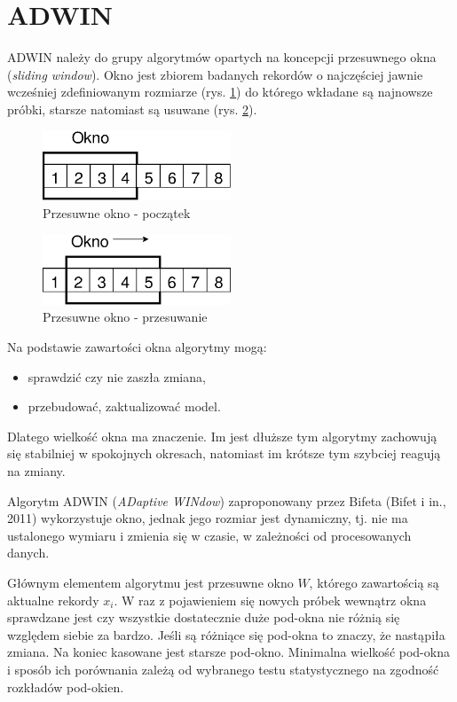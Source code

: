 \section{ADWIN}
\label{sec:ADWIN}
ADWIN należy do grupy algorytmów opartych na koncepcji przesuwnego okna (\textit{sliding window}).
Okno jest zbiorem badanych rekordów o najczęściej jawnie wcześniej zdefiniowanym rozmiarze (rys. \ref{fig:SlidingWindowInit})
do którego wkładane są najnowsze próbki, starsze natomiast są usuwane (rys. \ref{fig:SlidingWindowMove}).
\begin{figure}[htbp]
\centering
	\includegraphics[width=0.5\textwidth]{img/slidingWindowInit}
	\caption{Przesuwne okno - początek}
  \label{fig:SlidingWindowInit}
\end{figure}
\begin{figure}[htbp]
\centering
	\includegraphics[width=0.5\textwidth]{img/slidingWindowMove}
	\caption{Przesuwne okno - przesuwanie}
  \label{fig:SlidingWindowMove}
\end{figure}
Na podstawie zawartości okna algorytmy mogą:
\begin{itemize}
  \item sprawdzić czy nie zaszła zmiana,
  \item przebudować, zaktualizować model.
\end{itemize}
Dlatego wielkość okna ma znaczenie.
Im jest dłuższe tym algorytmy zachowują się stabilniej w spokojnych okresach,
natomiast im krótsze tym szybciej reagują na zmiany.

Algorytm ADWIN (\textit{ADaptive WINdow}) zaproponowany przez Bifeta (Bifet i in., 2011)
wykorzystuje okno, jednak jego rozmiar jest dynamiczny,
tj. nie ma ustalonego wymiaru i zmienia się w czasie, w zależności od procesowanych danych.

Głównym elementem algorytmu jest przesuwne okno $W$,
którego zawartością są aktualne rekordy $x_{i}$.
W raz z pojawieniem się nowych próbek wewnątrz okna
sprawdzane jest czy wszystkie dostatecznie duże pod-okna nie różnią się względem siebie za bardzo.
Jeśli są różniące się pod-okna to znaczy,
że nastąpiła zmiana. Na koniec kasowane jest starsze pod-okno.
Minimalna wielkość pod-okna i sposób ich porównania zależą od wybranego testu statystycznego
na zgodność rozkładów pod-okien.
